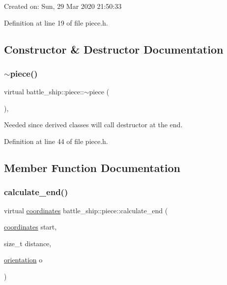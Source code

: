 Created on\+: Sun, 29 Mar 2020 21\+:50\+:33 

Definition at line 19 of file piece.\+h.



\subsection{Constructor \& Destructor Documentation}
\mbox{\label{classbattle__ship_1_1piece_a935d8c078457ff4327d83cc8fb43b06c}} 
\subsubsection{\texorpdfstring{$\sim$piece()}{~piece()}}
{\footnotesize\ttfamily virtual battle\+\_\+ship\+::piece\+::$\sim$piece (\begin{DoxyParamCaption}{ }\end{DoxyParamCaption})\hspace{0.3cm}{\ttfamily [inline]}, {\ttfamily [virtual]}}



Needed since derived classes will call destructor at the end. 



Definition at line 44 of file piece.\+h.



\subsection{Member Function Documentation}
\mbox{\label{classbattle__ship_1_1piece_a58092f7b1d663471204d7e51e68bbb2d}} 
\subsubsection{\texorpdfstring{calculate\+\_\+end()}{calculate\_end()}}
{\footnotesize\ttfamily virtual \hyperlink{structbattle__ship_1_1coordinates}{coordinates} battle\+\_\+ship\+::piece\+::calculate\+\_\+end (\begin{DoxyParamCaption}\item[{\hyperlink{structbattle__ship_1_1coordinates}{coordinates}}]{start,  }\item[{size\+\_\+t}]{distance,  }\item[{\hyperlink{namespacebattle__ship_aed87488f0a73f0d0679fe343fb61c784}{orientation}}]{o }\end{DoxyParamCaption})\hspace{0.3cm}{\ttfamily [pure virtual]}}



